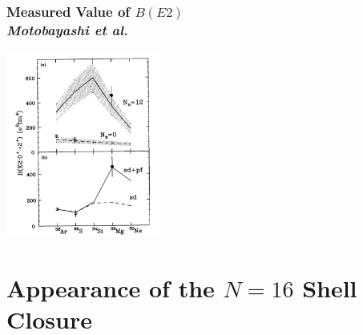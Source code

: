 \documentclass[accentcolor=tud2c,usenames,dvipsnames,colorbacktitle,inverttitle,landscape,german,presentation,t]{tudbeamer}
\begin{document}
\begin{frame}
  \end{frame}

  \begin{frame}
    \frametitle{Measured Value of $B(E2)$ \\ \small{\textit{Motobayashi et al.}}}

    \begin{center}
      \includegraphics[trim={0 0 0 0.0cm},clip,width=0.38\textwidth]{images/motobayashi3}
      \\ \small{\cite{Motobayashi:1995ei}}
    \end{center}
  \end{frame}

\section{Appearance of the $N=16$ Shell Closure}
\end{document}
